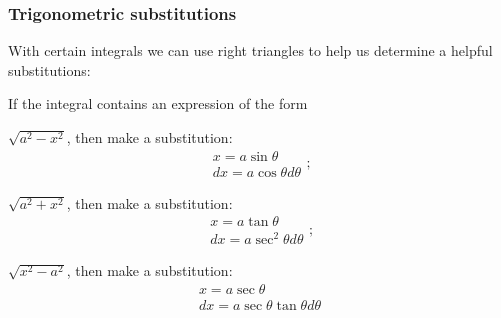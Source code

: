 \subsubsection*{Trigonometric substitutions}
\par
With certain integrals we can use right triangles to help us determine a helpful substitutions:
\par
If the integral contains an expression of the form
\begin{enumerate*}
    \item $\sqrt{a^2 - x^2}$, then make a substitution: 
    \useshortskip
    \[
        \begin{array}{c}
            x = a\sin \theta \\
            dx = a\cos \theta d\theta
        \end{array};
    \]
    \item $\sqrt{a^2 + x^2}$, then make a substitution:
    \useshortskip
    \[
        \begin{array}{c}
            x = a\tan \theta \\
            dx = a\sec^2 \theta d\theta
        \end{array};
    \]
    \item $\sqrt{x^2 - a^2}$, then make a substitution:
    \useshortskip
    \[
        \begin{array}{c}
            x = a\sec \theta \\
            dx = a\sec \theta \tan \theta d\theta
        \end{array}  
    \]
\end{enumerate*}

